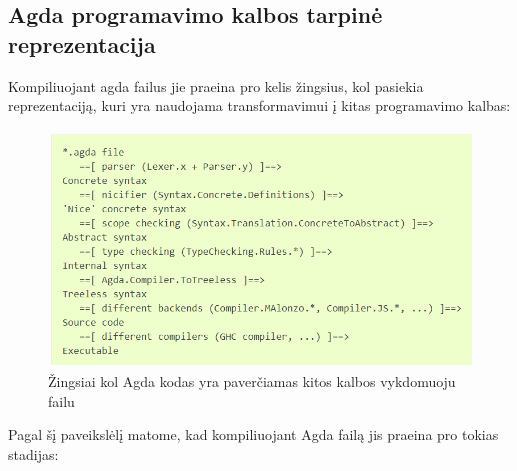 \documentclass{VUMIFPSkursinis}
\begin{document}
\subsection{Agda programavimo kalbos tarpinė reprezentacija}
Kompiliuojant agda failus jie praeina pro kelis žingsius, kol pasiekia reprezentaciją, kuri yra naudojama transformavimui į kitas programavimo kalbas:
\begin{figure}[H]
	\centering
	\includegraphics{agdaFileCompilation.png}
	\caption{Žingsiai kol Agda kodas yra paverčiamas kitos kalbos vykdomuoju failu \cite{AgdaWeb}}
	\centering
	\end{figure}
Pagal šį paveikslėlį matome, kad kompiliuojant Agda failą jis praeina pro tokias stadijas: 
\end{document}
